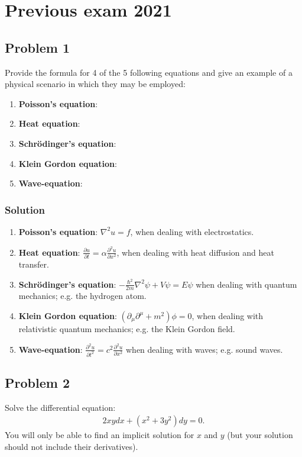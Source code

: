 \section{Previous exam 2021}

\subsection*{Problem 1}
Provide the formula for 4 of the 5 following equations and give an example of a physical scenario in which they may be employed:
\begin{enumerate}
    \item \textbf{Poisson's equation}:
    \item \textbf{Heat equation}:
    \item \textbf{Schrödinger's equation}:
    \item \textbf{Klein Gordon equation}:
    \item \textbf{Wave-equation}:
\end{enumerate}
\subsubsection*{Solution}
\begin{enumerate}
    \item \textbf{Poisson's equation}: $\nabla^2u = f$, when dealing with electrostatics.
    \item \textbf{Heat equation}: $\frac{\partial u}{\partial t} = \alpha \frac{\partial^2 u}{\partial x^2}$, when dealing with heat diffusion and heat transfer.
    \item \textbf{Schrödinger's equation}: $-\frac{\hbar^2}{2m}\nabla^2\psi + V\psi= E\psi$ when dealing with quantum mechanics; e.g. the hydrogen atom.
    \item \textbf{Klein Gordon equation}: $(\partial_\mu\partial^\mu + m^2)\phi = 0$, when dealing with relativistic quantum mechanics; e.g. the Klein Gordon field.
    \item \textbf{Wave-equation}: $\frac{\partial^2 u}{\partial t^2} = c^2 \frac{\partial^2 u}{\partial x^2}$ when dealing with waves; e.g. sound waves.
\end{enumerate}

\subsection*{Problem 2}
Solve the differential equation:
\begin{align*}
    2xydx + (x^2 + 3y^2)dy = 0.
\end{align*}
\note You will only be able to find an implicit solution for $x$ and $y$ (but your solution should
not include their derivatives).

